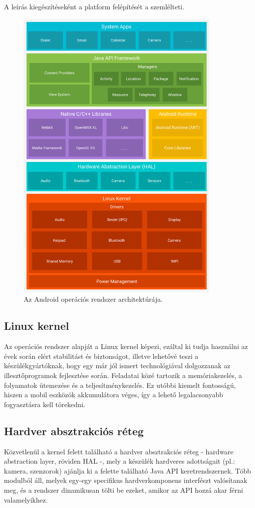 A leírás kiegészítéseként a platform felépítését a  szemlélteti.
\begin{figure}[!ht]
	\centering
	\includegraphics[width=100mm, keepaspectratio]{figures/android-stack_2x.png}
	\caption{Az Android operációs rendszer architektúrája.\cite{PlatformGuide}}
	\label{fig:AndroidPlatform}
\end{figure}

\subsection{Linux kernel}
Az operációs rendszer alapját a Linux kernel képezi, ezáltal ki tudja használni az évek során elért stabilitást és biztonságot, illetve lehetővé teszi a készülékgyártóknak, hogy egy már jól ismert technológiával dolgozzanak az illesztőprogramok fejlesztése során. Feladatai közé tartozik a memóriakezelés, a folyamatok ütemezése és a teljesítménykezelés. Ez utóbbi kiemelt fontosságú, hiszen a mobil eszközök akkumulátora véges, így a lehető legalacsonyabb fogyasztásra kell törekedni. \cite{MobWeb}

\subsection{Hardver absztrakciós réteg}
Közvetlenül a kernel felett található a hardver absztrakciós réteg - hardware abstraction layer, röviden HAL -, mely a készülék hardveres adottságait (pl.: kamera, szenzorok) ajánlja ki a felette található Java API keretrendszernek. Több modulból áll, melyek egy-egy specifikus hardverkomponens interfészt valósítanak meg, és a rendszer dinamikusan tölti be ezeket, amikor az API hozzá akar férni valamelyikhez. \cite{PlatformGuide}

